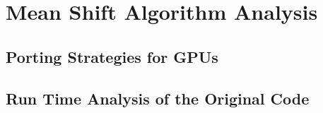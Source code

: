 \chapter{Mean Shift Algorithm Analysis} %
\label{cha:algorithm_analysis}


\section{Porting Strategies for GPUs} %
\label{sec:porting_strategies_for_gpu}

\section{Run Time Analysis of the Original Code} %
\label{sec:run_time_analysis_of_the_original_code}

